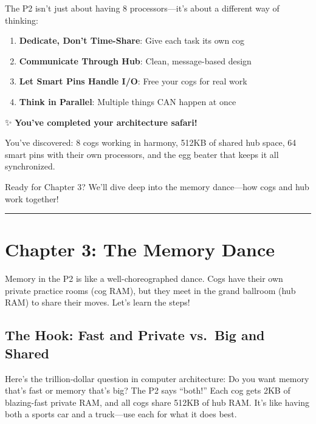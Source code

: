 \documentclass[11pt]{book}
\providecommand{\tightlist}{%
  \setlength{\itemsep}{0pt}\setlength{\parskip}{0pt}}
\begin{document}
The P2 isn't just about having 8 processors---it's about a different way
of thinking:

\begin{enumerate}
\def\labelenumi{\arabic{enumi}.}
\tightlist
\item
  \textbf{Dedicate, Don't Time-Share}: Give each task its own cog
\item
  \textbf{Communicate Through Hub}: Clean, message-based design
\item
  \textbf{Let Smart Pins Handle I/O}: Free your cogs for real work
\item
  \textbf{Think in Parallel}: Multiple things CAN happen at once
\end{enumerate}

\begin{chapterend}
✨ \textbf{You've completed your architecture safari!}

You've discovered: 8 cogs working in harmony, 512KB of shared hub space, 64 smart pins with their own processors, and the egg beater that keeps it all synchronized.

Ready for Chapter 3? We'll dive deep into the memory dance—how cogs and hub work together!
\end{chapterend}

\begin{center}\rule{0.5\linewidth}{0.5pt}\end{center}

\hypertarget{chapter-3-the-memory-dance}{%
\section{Chapter 3: The Memory Dance}\label{chapter-3-the-memory-dance}}

Memory in the P2 is like a well-choreographed dance. Cogs have their own
private practice rooms (cog RAM), but they meet in the grand ballroom
(hub RAM) to share their moves. Let's learn the steps!

\hypertarget{the-hook-fast-and-private-vs.-big-and-shared}{%
\subsection{The Hook: Fast and Private vs.~Big and
Shared}\label{the-hook-fast-and-private-vs.-big-and-shared}}

Here's the trillion-dollar question in computer architecture: Do you
want memory that's fast or memory that's big? The P2 says ``both!'' Each
cog gets 2KB of blazing-fast private RAM, and all cogs share 512KB of
hub RAM. It's like having both a sports car and a truck---use each for
what it does best.
\end{document}
